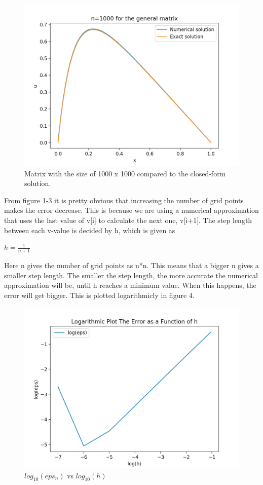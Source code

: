 \documentclass[%
oneside,                 %
final,                   %
10pt]{article}
\begin{document}
\begin{figure}[H]
  \includegraphics[scale=0.5]{figur1b_1000.png}
  \caption{Matrix with the size of 1000 x 1000 compared to the closed-form solution.}
  \label{1b_1000}
\end{figure}
\newpage{}

From figure 1-3 it is pretty obvious that increasing the number of grid points makes the error decrease. This is because we are using a numerical approximation that uses the last value of v[i] to calculate the next one, v[i+1]. The step length between each v-value is decided by h, which is given as
\begin{center}
    $h=\frac{1}{n+1}$
\end{center}
Here n gives the number of grid points as n*n. This means that a bigger n gives a smaller step length. The smaller the step length, the more accurate the numerical approximation will be, until h reaches a minimum value. When this happens, the error will get bigger. This is plotted logarithmicly in figure 4. 

\begin{figure}[H]
  \includegraphics[scale=0.5]{fig-error.png}
  \caption{$log_{10}(eps_n)$ vs $log_{10}(h)$}
  \label{1d}
\end{figure}
\end{document}
